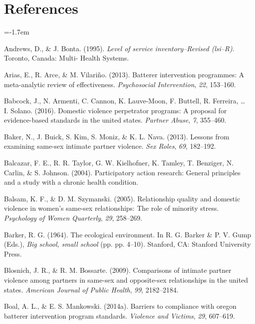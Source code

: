 \documentclass[11pt,]{tufte-book}
\newcommand{\refs}{
    \parindent=-1.7em\
    \
    \setlength{\parskip}{0.5\baselineskip}
}
\begin{document}
\part{References}

\refs

\hypertarget{refs}{}
\hypertarget{ref-andrews1994level}{}
Andrews, D., \& J. Bonta. (1995). \emph{Level of service
inventory--Revised (lsi--R)}. Toronto, Canada: Multi- Health Systems.

\hypertarget{ref-arias2013batterer}{}
Arias, E., R. Arce, \& M. Vilariño. (2013). Batterer intervention
programmes: A meta-analytic review of effectiveness. \emph{Psychosocial
Intervention}, \emph{22}, 153--160.

\hypertarget{ref-babcock2016domestic}{}
Babcock, J., N. Armenti, C. Cannon, K. Lauve-Moon, F. Buttell, R.
Ferreira, \ldots{} I. Solano. (2016). Domestic violence perpetrator
programs: A proposal for evidence-based standards in the united states.
\emph{Partner Abuse}, \emph{7}, 355--460.

\hypertarget{ref-baker2013lessons}{}
Baker, N., J. Buick, S. Kim, S. Moniz, \& K. L. Nava. (2013). Lessons
from examining same-sex intimate partner violence. \emph{Sex Roles},
\emph{69}, 182--192.

\hypertarget{ref-balcazar2004participatory}{}
Balcazar, F. E., R. R. Taylor, G. W. Kielhofner, K. Tamley, T. Benziger,
N. Carlin, \& S. Johnson. (2004). Participatory action research: General
principles and a study with a chronic health condition.

\hypertarget{ref-balsam2005relationship}{}
Balsam, K. F., \& D. M. Szymanski. (2005). Relationship quality and
domestic violence in women's same-sex relationships: The role of
minority stress. \emph{Psychology of Women Quarterly}, \emph{29},
258--269.

\hypertarget{ref-barker1964ecological}{}
Barker, R. G. (1964). The ecological environment. In R. G. Barker \& P.
V. Gump (Eds.), \emph{Big school, small school} (pp. pp. 4--10).
Stanford, CA: Stanford University Press.

\hypertarget{ref-blosnich2009comparisons}{}
Blosnich, J. R., \& R. M. Bossarte. (2009). Comparisons of intimate
partner violence among partners in same-sex and opposite-sex
relationships in the united states. \emph{American Journal of Public
Health}, \emph{99}, 2182--2184.

\hypertarget{ref-boal2014barriers}{}
Boal, A. L., \& E. S. Mankowski. (2014a). Barriers to compliance with
oregon batterer intervention program standards. \emph{Violence and
Victims}, \emph{29}, 607--619.
\end{document}

